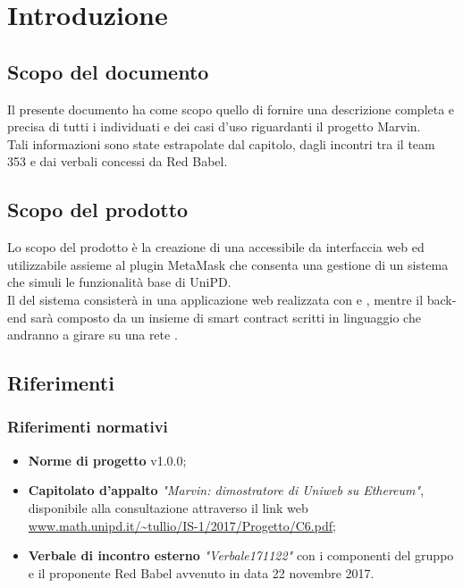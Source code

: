 \documentclass[AnalisiDeiRequisiti.tex]{subfiles}
\begin{document}
\chapter{Introduzione}
\section{Scopo del documento}
Il presente documento ha come scopo quello di fornire una descrizione completa e precisa di tutti i  individuati e dei casi d'uso riguardanti il progetto Marvin.\\
Tali informazioni sono state estrapolate dal capitolo, dagli incontri tra il team 353 e dai verbali concessi da Red Babel.

\section{Scopo del prodotto}
Lo scopo del prodotto è la creazione di una  accessibile da interfaccia web ed utilizzabile assieme al plugin MetaMask che consenta una gestione di un sistema che simuli le funzionalità base di UniPD.\\
Il  del sistema consisterà in una applicazione web realizzata con  e , mentre il back-end sarà composto da un insieme di smart contract scritti in linguaggio  che andranno a girare su una rete .\\

\section{Riferimenti}

\subsection{Riferimenti normativi}

\begin{itemize}
	\item \textbf{Norme di progetto} v1.0.0;\\
	\item \textbf{Capitolato d'appalto} \textit{"Marvin: dimostratore di Uniweb su Ethereum"}, disponibile alla consultazione attraverso il link web \url{www.math.unipd.it/~tullio/IS-1/2017/Progetto/C6.pdf};\\
	\item \textbf{Verbale di incontro esterno} \textit{"Verbale171122"} con i componenti del gruppo e il proponente Red Babel avvenuto in data 22 novembre 2017.
\end{itemize}
\end{document}
